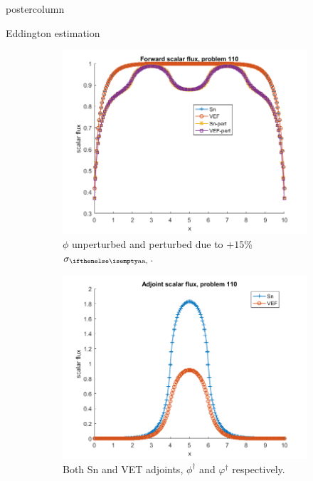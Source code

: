 \documentclass[xcolor={usenames,dvipsnames,svgnames,table}]{beamer}
\begin{document}
\begin{frame}
\begin{columns}
\begin{column}{.33\textwidth}
\begin{beamercolorbox}[center,wd=\textwidth]{postercolumn}
\begin{minipage}[T]{0.95\textwidth}
{\begin{block}{Eddington estimation}
\begin{figure}[H]
\label{Case110syst}
\centering
\begin{subfigure}{.33\textwidth}
  \centering
  \includegraphics[width=.98\linewidth]{110phi.png}
  \caption{$\phi$ unperturbed and perturbed due to $+15\%$ $\siga$.}
  \label{fig:sfig1}
\end{subfigure}
\begin{subfigure}{.33\textwidth}
  \centering
  \includegraphics[width=.98\linewidth]{110phia.png}
    \caption{Both Sn and VET adjoints, $\phi^\dag$ and $\varphi^\dag$ respectively.}
  \label{fig:sfig2}
\end{subfigure}%
\begin{subfigure}{.33\textwidth}
  \centering

\end{subfigure}
\end{figure}
\end{block}}
\end{minipage}
\end{beamercolorbox}
\end{column}
\end{columns}
\end{frame}
\end{document}
